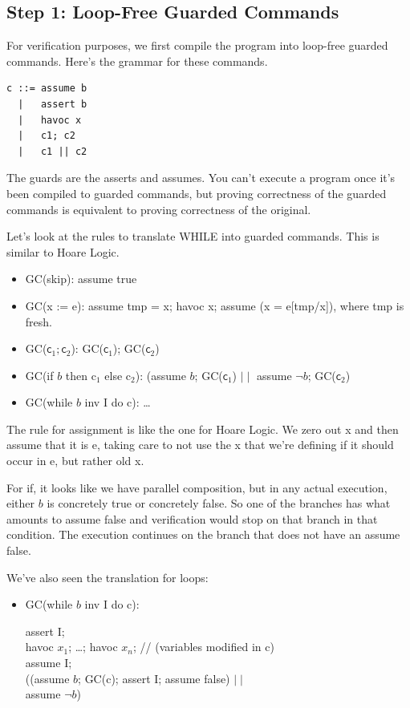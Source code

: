 \documentclass[11pt]{article}
\begin{document}
\subsection*{Step 1: Loop-Free Guarded Commands}
For verification purposes, we first compile the program into loop-free guarded commands.
Here's the grammar for these commands.

\begin{verbatim}
c ::= assume b
  |   assert b
  |   havoc x
  |   c1; c2
  |   c1 || c2
\end{verbatim}
The guards are the asserts and assumes. You can't execute a program once it's been compiled to guarded commands,
but proving correctness of the guarded commands is equivalent to proving correctness of the original.

Let's look at the rules to translate WHILE into guarded commands. This is similar to Hoare Logic.
\begin{itemize}[noitemsep]
\item GC(\textsf{skip}): \textsf{assume true}
\item GC(\textsf{x := e}): \textsf{assume tmp = x; havoc x; assume (x = e[tmp/x])}, where \textsf{tmp} is fresh.
\item GC($\mathsf{c}_1; \mathsf{c}_2$): GC($\mathsf{c}_1$); GC($\mathsf{c}_2$)
\item GC(\textsf{if $b$ then c$_1$ else c$_2$}): (\textsf{assume $b$;} GC($\mathsf{c}_1$) $\mid \mid$ \textsf{assume $\neg b$;} GC($\mathsf{c}_2$)
\item GC(\textsf{while $b$ inv I do c}): \ldots
\end{itemize}

The rule for assignment is like the one for Hoare Logic. We zero out \textsf{x} and then assume that it is \textsf{e}, taking care to not use the \textsf{x} that we're defining if it should occur in \textsf{e}, but rather old \textsf{x}.

For \textsf{if}, it looks like we have parallel composition, but in any actual execution, either $b$ is concretely true or concretely false. So one of the branches has what amounts to \textsf{assume false} and verification would stop on that branch in that condition. The execution continues on the branch that does not have an \textsf{assume false}.

We've also seen the translation for loops:
\begin{itemize}[noitemsep]
\item GC(\textsf{while $b$ inv I do c}): \\
\hspace*{2em}
  \begin{minipage}{.8\textwidth}
    \textsf{assert I;} \\
    \textsf{havoc $x_1$; \ldots; havoc $x_n$;} \qquad \qquad // (variables modified in \textsf{c})\\
    \textsf{assume I;} \\
    \textsf{((assume $b$; }GC\textsf{(c); assert I; assume false) $\mid \mid$} \\
    \textsf{\hspace*{1em} assume $\neg b$)}
  \end{minipage}
\end{itemize}
\end{document}
